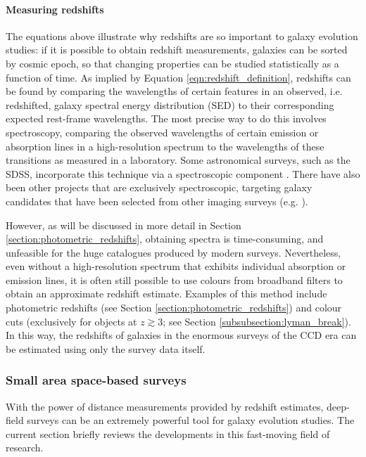 \paragraph{Measuring redshifts} 
The equations above illustrate why redshifts are so important to galaxy evolution studies: if it is possible to obtain redshift measurements, galaxies can be sorted by cosmic epoch, so that changing properties can be studied statistically as a function of time.  As implied by Equation \ref{eqn:redshift_definition}, redshifts can be found by comparing the wavelengths of certain features in an observed, i.e. redshifted, galaxy spectral energy distribution (SED) to their corresponding expected rest-frame wavelengths. The most precise way to do this involves spectroscopy, comparing the observed wavelengths of certain emission or absorption lines in a high-resolution spectrum to the wavelengths of these transitions as measured in a laboratory. Some astronomical surveys, such as the SDSS, incorporate this technique via a spectroscopic component  \citep{2012AJ....144..144B}. There have also been other projects that are exclusively spectroscopic, targeting galaxy candidates that have been selected from other imaging surveys (e.g. \citealt{2001MNRAS.328.1039C, 2005ApJ...620..595W,2005A&A...439..845L}).  \par

However, as will be discussed in more detail in Section \ref{section:photometric_redshifts}, obtaining spectra is time-consuming, and unfeasible for the huge catalogues produced by modern surveys. Nevertheless, even without a high-resolution spectrum that exhibits individual absorption or emission lines, it is often still possible to use colours from broadband filters to obtain an approximate redshift estimate. Examples of this method include photometric redshifts (see Section \ref{section:photometric_redshifts}) and colour cuts (exclusively for objects at $z\gtrsim3$; see Section \ref{subsubsection:lyman_break}). In this way, the redshifts of galaxies in the enormous surveys of the CCD era can be estimated using only the survey data itself.  \par


\subsubsection{Small area space-based surveys}\label{subsubsection:space_based_surveys}
With the power of distance measurements provided by redshift estimates, deep-field surveys can be an extremely powerful tool for galaxy evolution studies. The current section briefly reviews the developments in this fast-moving field of research.  \par


